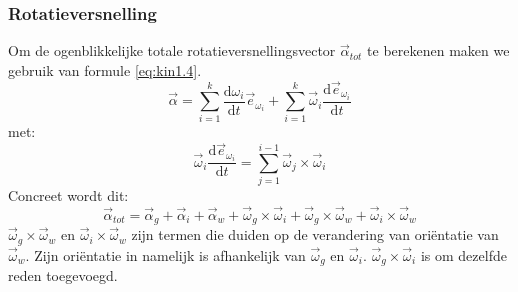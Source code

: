 \subsubsection{Rotatieversnelling}
Om de ogenblikkelijke totale rotatieversnellingsvector $\vec{\alpha}_{tot}$ te berekenen maken we gebruik van formule \eqref{eq:kin1.4}.
\begin{equation}
\vec{\alpha} = \sum_{i=1}^{k}{\frac{\mathrm{d}\omega_{i}}{\mathrm{d}t}\vec{e}_{\omega_{i}}}+\sum_{i=1}^{k}{\vec{\omega}_{i}\frac{\mathrm{d}\vec{e}_{\omega_{i}}}{\mathrm{d}t}}  
\label{eq:kin1.4}
\end{equation}
met:
\begin{equation}
\vec{\omega}_{i}\frac{\mathrm{d}\vec{e}_{\omega_{i}}}{\mathrm{d}t}=\sum_{j=1}^{i-1}{\vec{\omega}_{j}\times\vec{\omega}_{i}}  
\label{eq:kin1.5}
\end{equation}
Concreet wordt dit:
\begin{equation}
\vec{\alpha}_{tot} = \vec{\alpha}_{g} + \vec{\alpha}_{i} + \vec{\alpha}_{w} + \vec{\omega}_{g} \times \vec{\omega}_{i} + \vec{\omega}_{g} \times \vec{\omega}_{w} + \vec{\omega}_{i} \times \vec{\omega}_{w}
\label{eq:kin1.6}
\end{equation}
$\vec{\omega}_{g} \times \vec{\omega}_{w}$ en $\vec{\omega}_{i} \times \vec{\omega}_{w}$ zijn termen die duiden op de verandering van oriëntatie van $\vec{\omega}_{w}$. Zijn oriëntatie in namelijk is afhankelijk van $\vec{\omega}_{g}$ en $\vec{\omega}_{i}$. $\vec{\omega}_{g} \times \vec{\omega}_{i}$ is om dezelfde reden toegevoegd.

